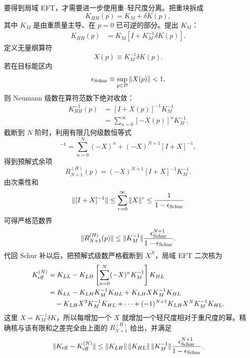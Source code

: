 \begin{derivation}
要得到局域 EFT，才需要进一步使用重--轻尺度分离。把重块拆成
\begin{equation*}
 K_{HH}(p)=K_M+\delta K(p),
\end{equation*}
其中 $K_M$ 是由重质量主导、在 $p=0$ 已可逆的部分。提出 $K_M$：
\begin{align*}
 K_{HH}(p)
 &=K_M\left[I+K_M^{-1}\delta K(p)\right].
\end{align*}
定义无量纲算符
\begin{equation*}
 X(p)\equiv K_M^{-1}\delta K(p).
\end{equation*}
若在目标能区内
\begin{equation*}
 \epsilon_{\rm Schur}\equiv\sup_{p\in\mathcal D}\|X(p)\|<1,
\end{equation*}
则 Neumann 级数在算符范数下绝对收敛：
\begin{align*}
 K_{HH}^{-1}(p)
 &=[I+X(p)]^{-1}K_M^{-1}\\
 &=\sum_{n=0}^{\infty}[-X(p)]^nK_M^{-1}.
\end{align*}
截断到 $N$ 阶时，利用有限几何级数恒等式
\begin{equation*}
 [I+X]^{-1}
 =\sum_{n=0}^{N}(-X)^n
 +(-X)^{N+1}[I+X]^{-1},
\end{equation*}
得到预解式余项
\begin{equation*}
 R_{N+1}^{(H)}(p)
 =(-X)^{N+1}[I+X]^{-1}K_M^{-1}.
\end{equation*}
由次乘性和
\begin{equation*}
 \|[I+X]^{-1}\|
 \le\sum_{r=0}^{\infty}\|X\|^r
 \le\frac1{1-\epsilon_{\rm Schur}}
\end{equation*}
可得严格范数界
\begin{equation*}
 \|R_{N+1}^{(H)}(p)\|
 \le
 \|K_M^{-1}\|
 \frac{\epsilon_{\rm Schur}^{N+1}}{1-\epsilon_{\rm Schur}}.
\end{equation*}
代回 Schur 补以后，把预解式级数严格截断到 $X^N$，局域 EFT 二次核为
\begin{align*}
 K_{\rm eff}^{(N)}
 &=K_{LL}
 -K_{LH}
 \left[\sum_{n=0}^{N}(-X)^nK_M^{-1}\right]
 K_{HL}\\
 &=K_{LL}
 -K_{LH}K_M^{-1}K_{HL}
 +K_{LH}XK_M^{-1}K_{HL}\\
 &\quad-K_{LH}X^2K_M^{-1}K_{HL}
 +\cdots
 +(-1)^{N+1}K_{LH}X^NK_M^{-1}K_{HL}.
\end{align*}
这里 $X=K_M^{-1}\delta K$，所以每增加一个 $X$ 就增加一个轻尺度相对于重尺度的幂。精确核与该有限和之差完全由上面的 $R_{N+1}^{(H)}$ 给出，并满足
\begin{equation*}
 \|K_{\rm eff}-K_{\rm eff}^{(N)}\|
 \le
 \|K_{LH}\|\,\|K_{HL}\|\,
 \|K_M^{-1}\|
 \frac{\epsilon_{\rm Schur}^{N+1}}{1-\epsilon_{\rm Schur}}.
\end{equation*}


\end{derivation}
